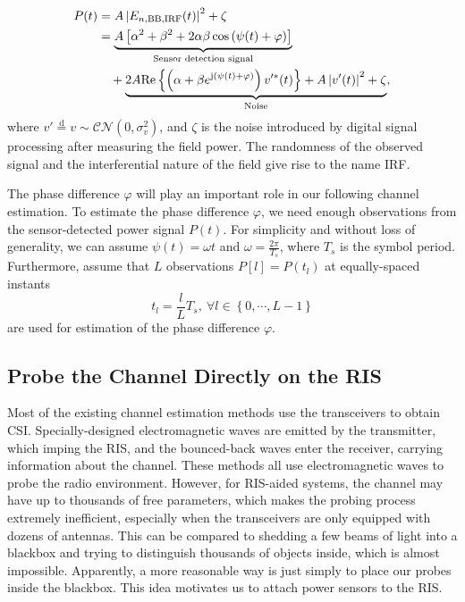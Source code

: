 \documentclass[12pt,draftclsnofoot,journal,onecolumn]{IEEEtran}
\theoremstyle{nonumberplain}
\begin{document}
    \begin{equation}
        \label{eqn:power of interference}
        \begin{aligned}
            P(t)&=A \left| E_{n, {\rm BB, IRF}} (t)\right |^{2}+\zeta\\
            &=\underbrace{A\left[\alpha^{2}+\beta^{2}+2\alpha\beta\cos\left(\psi(t)+\varphi\right)\right]}_{\text{Sensor detection signal}}\\
            &~~~+\underbrace{2A\text{Re}\left\{\left(\alpha+\beta e^{{\rm j}\left(\psi(t)+\varphi\right)}\right)v'^{*}(t)\right\}+A\left|v'(t)\right|^{2}+\zeta}_{\text{Noise}},\\
        \end{aligned}
    \end{equation}
    where $v'\overset{\text{d}}{=}v\sim\mathcal{CN}\left(0,\sigma_{v}^{2}\right)$, and $\zeta$ is the noise introduced by digital signal processing after measuring the field power. The randomness of the observed signal and the interferential nature of the field give rise to the name \ac{IRF}. 

    The phase difference $\varphi$ will play an important role in our following channel estimation. To estimate the phase difference $\varphi$, we need enough observations from the sensor-detected power signal $P(t)$. For simplicity and without loss of generality, we can assume $\psi(t)=\omega t$ and $\omega=\frac{2\pi}{T_{s}}$, where $T_s$ is the symbol period. Furthermore, assume that $L$ observations $P[l]=P(t_{l})$ at equally-spaced instants 
    \begin{equation}
        \label{observation time}
        t_{l}=\frac{l}{L}T_{s},~\forall l\in \left\{0,\cdots ,L-1\right\}
    \end{equation}
    are used for estimation of the phase difference $\varphi$.

\subsection{Probe the Channel Directly on the RIS}
    Most of the existing channel estimation methods use the transceivers to obtain  CSI. 
    Specially-designed electromagnetic waves are emitted by the transmitter, which imping the RIS, and the bounced-back waves enter the receiver, carrying information about the channel. 
    These methods all use electromagnetic waves to probe the radio environment. 
    However, for RIS-aided systems, the channel may have up to thousands of free parameters, which makes the probing process extremely inefficient, especially when the transceivers are only equipped with dozens of antennas. This can be compared to shedding a few beams of light into a blackbox and trying to distinguish thousands of objects inside, which is almost impossible. Apparently, a more reasonable way is just simply to place our probes inside the blackbox. This idea motivates us to attach power sensors to the RIS. 
\end{document}

